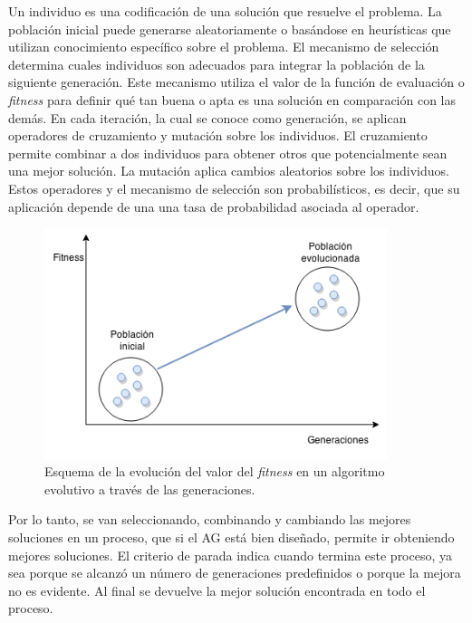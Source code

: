Un individuo es una codificación de una solución que resuelve el problema. La población inicial puede generarse aleatoriamente o basándose en heurísticas que utilizan conocimiento específico sobre el problema. El mecanismo de selección determina cuales individuos son adecuados para integrar la población de la siguiente generación. Este mecanismo utiliza el valor de la función de evaluación o \emph{fitness} para definir qué tan buena o apta es una solución en comparación con las demás. En cada iteración, la cual se conoce como generación, se aplican operadores de cruzamiento y mutación sobre los individuos. El cruzamiento permite combinar a dos individuos para obtener otros que potencialmente sean una mejor solución. La mutación aplica cambios aleatorios sobre los individuos. Estos operadores y el mecanismo de selección son probabilísticos, es decir, que su aplicación depende de una una tasa de probabilidad asociada al operador.


\begin{figure}[ht]
	\centering
	\includegraphics[width=10cm]{Figures/fitness_generaciones}
	\caption[Esquema de la evolución del valor del fitness en un algoritmo evolutivo ]{Esquema de la evolución del valor del \emph{fitness} en un algoritmo evolutivo a través de las generaciones.}
	\label{fig:fitness_generaciones}
\end{figure}

Por lo tanto, se van seleccionando, combinando y cambiando las mejores soluciones en un proceso, que si el AG está bien diseñado, permite ir obteniendo mejores soluciones. El criterio de parada indica cuando termina este proceso, ya sea porque se alcanzó un número de generaciones predefinidos o porque la mejora no es evidente. Al final se devuelve la mejor solución encontrada en todo el proceso.



